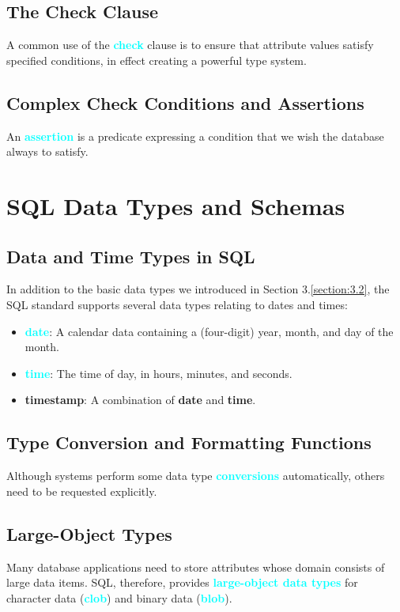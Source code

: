 \documentclass[a4paper,12pt,twoside,openany]{book}
\newcommand{\textcy}[1]{\textbf{\textcolor{cyan}{#1}}}
\begin{document}
\subsection{The Check Clause}

A common use of the \textcy{check} clause is to ensure that attribute values satisfy specified conditions, in effect creating a powerful type system.

\subsection{Complex Check Conditions and Assertions}

An \textcy{assertion} is a predicate expressing a condition that we wish the database always to satisfy.

\section{SQL Data Types and Schemas}
\subsection{Data and Time Types in SQL}

In addition to the basic data types we introduced in Section 3.\ref{section:3.2}, the SQL standard supports several data types relating to dates and times:
\begin{itemize}
    \item \textcy{date}: A calendar data containing a (four-digit) year, month, and day of the month.
    \item \textcy{time}: The time of day, in hours, minutes, and seconds.
    \item \textbf{timestamp}: A combination of \textbf{date} and \textbf{time}.
\end{itemize}

\subsection{Type Conversion and Formatting Functions}

Although systems perform some data type \textcy{conversions} automatically, others need to be requested explicitly.

\subsection{Large-Object Types}

Many database applications need to store attributes whose domain consists of large data items. SQL, therefore, provides \textcy{large-object data types} for character data (\textcy{clob}) and binary data (\textcy{blob}).
\end{document}
